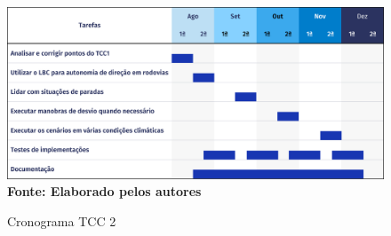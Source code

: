 \documentclass[a4paper,12pt,Times]{article}
\begin{document}
\begin{figure}[H]
    \centering
    \caption{Cronograma TCC 2}
    \includegraphics[scale=0.25]{figuras/TCC.png}\captionsetup{justification=centering}
  \vspace{-0.2cm}
     \\\textbf{\footnotesize Fonte: Elaborado pelos autores}
    \label{fig:cronograma}
\end{figure}







 
 



\iffalse
 \newpage
 \singlespace{
 
 
 }
\end{document}
